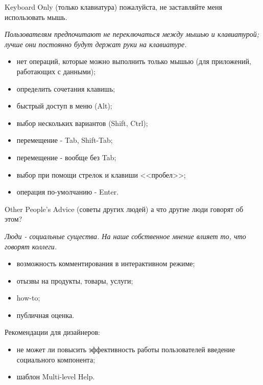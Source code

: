 \documentclass{beamer}
\begin{document}
\begin{frame}[t]	
	\begin{block}{Keyboard Only (только клавиатура)}
		 пожалуйста, не заставляйте меня использовать мышь.
	\end{block}	
	\textit{Пользователям предпочитают не переключаться между мышью и клавиатурой; лучше они постоянно будут держат руки на клавиатуре.}
	\begin{itemize}
		\item нет операций, которые можно выполнить только мышью (для приложений, работающих с данными);
		\item определить сочетания клавишь;
		\item быстрый доступ в меню (Alt);
		\item выбор нескольких вариантов (Shift, Ctrl);		
		\item перемещение - Tab, Shift-Tab;
		\item перемещение - вообще без Tab;		
		\item выбор при помощи стрелок и клавиши <<пробел>>;
		\item операция по-умолчанию - Enter.				
	\end{itemize}
\end{frame}

\begin{frame}[t]	
	\begin{block}{Other People’s Advice (советы других людей)}
		 а что другие люди говорят об этом?
	\end{block}	
	\textit{Люди - социальные существа. На наше собственное мнение влияет то, что говорят коллеги.}
	\begin{itemize}
		\item возможность комментирования в интерактивном режиме;
		\item отызвы на продукты, товары, услуги;
		\item how-to;
		\item публичная оценка.		
	\end{itemize}
	Рекомендации для дизайнеров:
	\begin{itemize}
		\item не может ли повысить эффективность работы пользователей введение социального компонента;
		\item шаблон Multi-level Help.
	\end{itemize}		
\end{frame}
\end{document}
